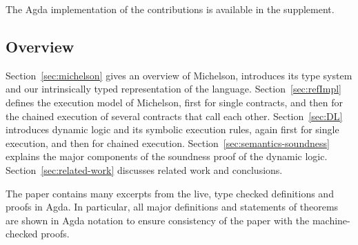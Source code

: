 The Agda implementation of the contributions is available in the
supplement.


\subsection*{Overview}
\label{sec:overview}

Section~\ref{sec:michelson} gives an overview of Michelson, introduces
its type system and our intrinsically typed representation of the language.
Section~\ref{sec:refImpl} defines the execution model of Michelson,
first for single contracts, and then for the chained execution of
several contracts that call each other.
Section~\ref{sec:DL} introduces dynamic logic and its
symbolic execution rules, again first for single execution, and then
for chained execution.
Section~\ref{sec:semantics-soundness} explains the major components of
the soundness proof of the dynamic logic.
Section~\ref{sec:related-work} discusses related work and conclusions.

The paper contains many excerpts from the live, type checked
definitions and proofs in Agda. In particular, all major definitions
and statements of theorems are shown in Agda notation to ensure
consistency of the paper with the machine-checked proofs.


